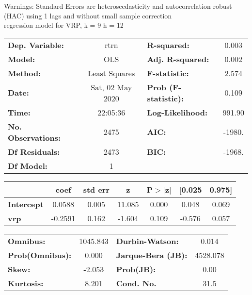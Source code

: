 Warnings: \newline
 [1] Standard Errors are heteroscedasticity and autocorrelation robust (HAC) using 1 lags and without small sample correction\\ 

regression model for VRP, k = 9 h = 12\begin{center}
\begin{tabular}{lclc}
\toprule
\textbf{Dep. Variable:}    &       rtrn       & \textbf{  R-squared:         } &     0.003   \\
\textbf{Model:}            &       OLS        & \textbf{  Adj. R-squared:    } &     0.002   \\
\textbf{Method:}           &  Least Squares   & \textbf{  F-statistic:       } &     2.574   \\
\textbf{Date:}             & Sat, 02 May 2020 & \textbf{  Prob (F-statistic):} &    0.109    \\
\textbf{Time:}             &     22:05:36     & \textbf{  Log-Likelihood:    } &    991.90   \\
\textbf{No. Observations:} &        2475      & \textbf{  AIC:               } &    -1980.   \\
\textbf{Df Residuals:}     &        2473      & \textbf{  BIC:               } &    -1968.   \\
\textbf{Df Model:}         &           1      & \textbf{                     } &             \\
\bottomrule
\end{tabular}
\begin{tabular}{lcccccc}
                   & \textbf{coef} & \textbf{std err} & \textbf{z} & \textbf{P$> |$z$|$} & \textbf{[0.025} & \textbf{0.975]}  \\
\midrule
\textbf{Intercept} &       0.0588  &        0.005     &    11.085  &         0.000        &        0.048    &        0.069     \\
\textbf{vrp}       &      -0.2591  &        0.162     &    -1.604  &         0.109        &       -0.576    &        0.057     \\
\bottomrule
\end{tabular}
\begin{tabular}{lclc}
\textbf{Omnibus:}       & 1045.843 & \textbf{  Durbin-Watson:     } &    0.014  \\
\textbf{Prob(Omnibus):} &   0.000  & \textbf{  Jarque-Bera (JB):  } & 4528.078  \\
\textbf{Skew:}          &  -2.053  & \textbf{  Prob(JB):          } &     0.00  \\
\textbf{Kurtosis:}      &   8.201  & \textbf{  Cond. No.          } &     31.5  \\
\bottomrule
\end{tabular}
\end{center}

